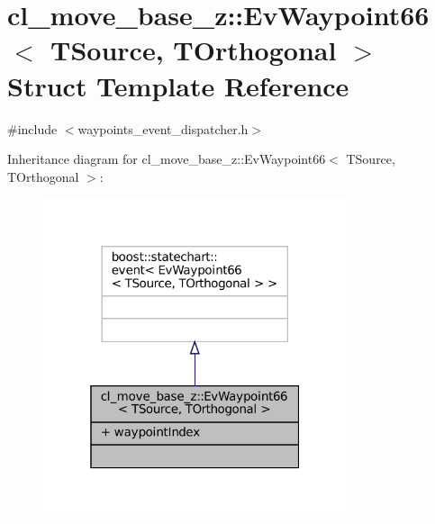 \hypertarget{structcl__move__base__z_1_1EvWaypoint66}{}\section{cl\+\_\+move\+\_\+base\+\_\+z\+:\+:Ev\+Waypoint66$<$ T\+Source, T\+Orthogonal $>$ Struct Template Reference}
\label{structcl__move__base__z_1_1EvWaypoint66}


{\ttfamily \#include $<$waypoints\+\_\+event\+\_\+dispatcher.\+h$>$}



Inheritance diagram for cl\+\_\+move\+\_\+base\+\_\+z\+:\+:Ev\+Waypoint66$<$ T\+Source, T\+Orthogonal $>$\+:
\nopagebreak
\begin{figure}[H]
\begin{center}
\leavevmode
\includegraphics[width=253pt]{structcl__move__base__z_1_1EvWaypoint66__inherit__graph}
\end{center}
\end{figure}


